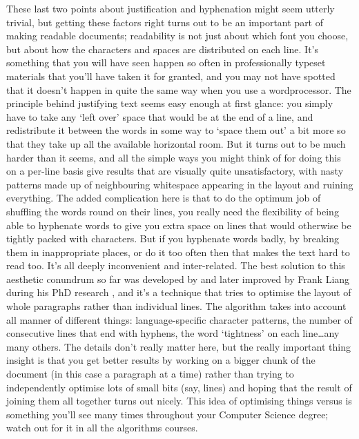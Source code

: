 \begin{refsection}
These last two points about justification and hyphenation might seem utterly trivial, but getting these factors right turns out to be an important part of making readable documents; readability is not just about which font you choose, but about how the characters and spaces are distributed on each line. It's something that you will have seen happen so often in professionally typeset materials that you'll have taken it for granted, and you may not have spotted that it doesn't happen in quite the same way when you use a wordprocessor. The principle behind justifying text seems easy enough at first glance: you simply have to take any `left over' space that would be at the end of a line, and redistribute it between the words in some way to `space them out' a bit more so that they take up all the available horizontal room. But it turns out to be much harder than it seems, and all the simple ways you might think of for doing this on a per-line basis give results that are visually quite unsatisfactory, with nasty patterns made up of neighbouring whitespace appearing in the layout and ruining everything. The added complication here is that to do the optimum job of shuffling the words round on their lines, you really need the flexibility of being able to hyphenate words to give you extra space on lines that would otherwise be tightly packed with characters. But if you hyphenate words badly, by breaking them in inappropriate places, or do it too often then that makes the text hard to read too. It's all deeply inconvenient and inter-related. The best solution to this aesthetic conundrum so far was developed by \cite{SPE:SPE4380111102} and later improved by Frank Liang during his PhD research \citep{liang}, and it's a technique that tries to optimise the layout of whole paragraphs rather than individual lines. The algorithm takes into account all manner of different things: language-specific character patterns, the number of consecutive lines that end with hyphens, the word `tightness' on each line\ldots any many others. The details don't really matter here, but the really important thing insight is that you get better results by working on a bigger chunk of the document (in this case a paragraph at a time) rather than trying to independently optimise lots of small bits (say, lines) and hoping that the result of joining them all together turns out nicely. This idea of optimising things  versus  is something you'll see many times throughout your Computer Science degree; watch out for it in all the algorithms courses.


\end{refsection}
